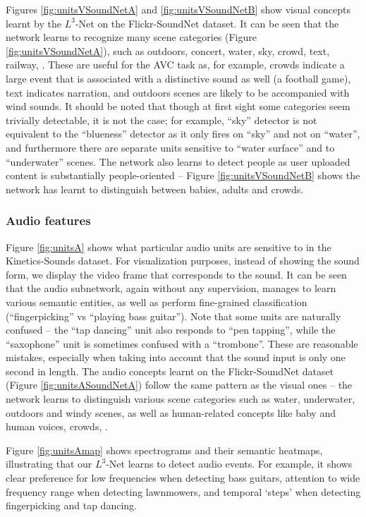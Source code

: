 \documentclass[10pt,twocolumn,letterpaper]{article}
\begin{document}
%
Figures \ref{fig:unitsVSoundNetA} and \ref{fig:unitsVSoundNetB} show
visual concepts learnt by the $L^3$-Net on the Flickr-SoundNet dataset.
It can be seen that the network learns to recognize many scene categories
(Figure \ref{fig:unitsVSoundNetA}),
such as outdoors, concert, water, sky, crowd, text, railway, \etc.
These are useful for the AVC task as, for example, crowds indicate a large
event that is associated with a distinctive sound as well
(\eg a football game), text indicates narration, and outdoors scenes are
likely to be accompanied with wind sounds.
It should be noted that though at first sight some categories seem trivially
detectable, it is not the case; for example, ``sky'' detector is not equivalent to
the ``blueness'' detector as it only fires on ``sky'' and not on ``water'',
and furthermore there are separate units sensitive to ``water surface''
and to ``underwater'' scenes.
The network also learns to detect people as user uploaded content is
substantially people-oriented -- Figure \ref{fig:unitsVSoundNetB} shows
the network has learnt to distinguish between babies, adults and crowds.

\figUnitsVSoundNetA


\subsubsection{Audio features}
Figure \ref{fig:unitsA} shows what particular audio units
are sensitive to in the Kinetics-Sounds dataset.
For visualization purposes, instead of showing
the sound form, we display the video frame that corresponds to the sound.
It can be seen that the audio subnetwork, again without any supervision,
manages to learn various semantic entities, as well as perform fine-grained
classification (``fingerpicking'' vs ``playing bass guitar'').
Note that some units are naturally confused -- the ``tap dancing'' unit also
responds to ``pen tapping'', while the ``saxophone'' unit is sometimes
confused with a ``trombone''. These are reasonable mistakes, especially
when taking into account that the sound input is only one second in length.
The audio concepts learnt on the Flickr-SoundNet dataset (Figure \ref{fig:unitsASoundNetA}) follow
the same pattern as the visual ones -- the network learns to distinguish
various scene categories such as water, underwater, outdoors and windy scenes,
as well as human-related concepts like baby and human voices, crowds, \etc.

Figure \ref{fig:unitsAmap} shows spectrograms and their semantic heatmaps,
illustrating that our $L^3$-Net learns to detect audio events.
For example, it shows clear preference for low frequencies when detecting
bass guitars, attention to wide frequency range when detecting lawnmowers,
and temporal `steps' when detecting fingerpicking and tap dancing.
\end{document}
